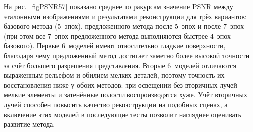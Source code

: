На рис.~\ref{figPSNR57} показано среднее по ракурсам значение PSNR между эталонными изображениями и результатами реконструкции для трёх вариантов: базового метода (5~эпох), предложенного метода после 5~эпох и после 7~эпох (при этом все 7~эпох предложенного метода выполняются быстрее 4~эпох базового). Первые 6~моделей имеют относительно гладкие поверхности, благодаря чему предложенный метод достигает заметно более высокой точности за счёт большего разрешения представления. Вторые 6~моделей отличаются выраженным рельефом и обилием мелких деталей, поэтому точность их восстановления ниже у обоих методов: при освещении без вторичных лучей мелкие элементы и затенённые полости воспроизводятся хуже. Учёт вторичных лучей способен повысить качество реконструкции на подобных сценах, а включение этих моделей в последующие тесты позволит нагляднее оценивать развитие метода.

